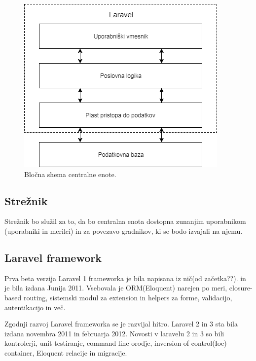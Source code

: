 \documentclass[12pt,a4paper,titlepage,openany]{report}
\begin{document}
\begin{figure}[H]
\begin{center}
\includegraphics[width=1\linewidth]{Slike/CentralnaEnota.png}
\end{center}
\caption{ Bločna shema centralne enote.}\label{slika:CentralnaEnota}
\end{figure}

\subsection{Strežnik}
Strežnik bo služil za to, da bo centralna enota dostopna zunanjim uporabnikom (uporabniki in merilci) in za povezavo gradnikov, ki se bodo izvajali na njemu.


\subsection{Laravel framework}
Prva beta verzija Laravel 1 frameworka je bila napisana iz nič(od začetka??). in je bila izdana Junija 2011. Vsebovala je ORM(Eloquent) narejen po meri, closure-based routing, sistemski modul za extension in helpers za forme, validacijo, autentikacijo in več.

Zgodnji razvoj Laravel frameworka se je razvijal hitro. Laravel 2 in 3 sta bila izdana novembra 2011 in februarja 2012. Novosti v laravelu 2 in 3 so bili kontrolerji, unit testiranje, command line orodje, inversion of control(Ioc) container, Eloquent relacije in migracije.
\end{document}
